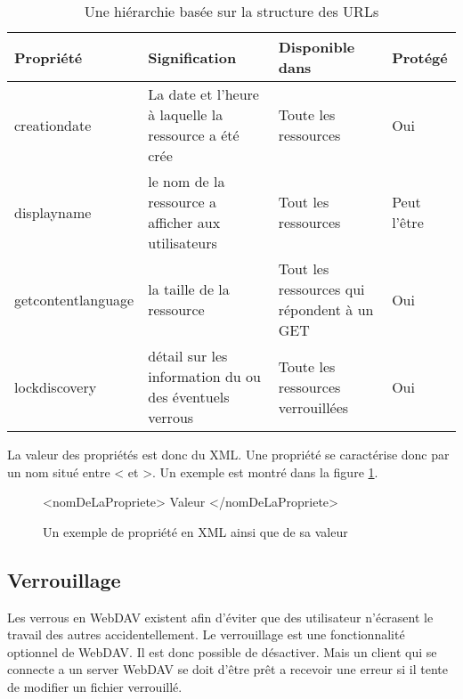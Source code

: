 \documentclass[a4paper, 11pt]{article}
\begin{document}
{		\begin{table}[htc]
		\begin{center}
			\begin{tabular}{p{4cm}|p{4cm}|p{3.5cm}|p{2cm}}
			\hline
			\hline
			Propriété & Signification & Disponible dans & Protégé \\
			\hline
			creationdate & La date et l'heure à laquelle la ressource a été crée & Toute les ressources & Oui \\
			\hline
			displayname & le nom de la ressource a afficher aux utilisateurs & Tout les ressources & Peut l'être \\
			\hline
			getcontentlanguage & la taille de la ressource & Tout les ressources qui répondent à un GET & Oui \\
			\hline
			lockdiscovery & détail sur les information du ou des éventuels verrous & Toute les ressources verrouillées & Oui \\
			\hline
			\end{tabular}
		\caption{Une hiérarchie basée sur la structure des URLs}
		\label{tab:ex_prop}
		\end{center}
		\end{table}
		
		La valeur des propriétés est donc du XML. Une propriété se caractérise donc par un nom situé entre < et >. Un exemple est montré dans la figure \ref{fig:ex_prop}. 
		
		\begin{figure}[ht]
		\begin{center}	
		\begin{boxedverbatim}
			<nomDeLaPropriete>
				Valeur
			</nomDeLaPropriete>
		\end{boxedverbatim}
		\caption{Un exemple de propriété en XML ainsi que de sa valeur}
		\label{fig:ex_prop}
		\end{center}
		\end{figure}


	\subsection{Verrouillage}
	
		Les verrous en WebDAV existent afin d'éviter que des utilisateur n'écrasent le travail des autres accidentellement. Le verrouillage est une fonctionnalité optionnel de WebDAV. Il est donc possible de désactiver. Mais un client qui se connecte a un server WebDAV se doit d'être prêt a recevoir une erreur si il tente de modifier un fichier verrouillé.
		
}
\end{document}
